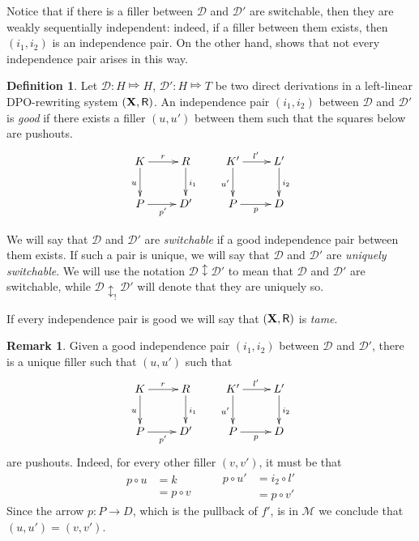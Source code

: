 \documentclass[a4paper]{article}
\def\R{\mathsf{R}}
\def\X{\textbf {\textup{X}}}
\renewcommand{\P}{\textbf {\textup{P}}}
\newcommand{\dder}[1]{\mathscr{#1}}
\theoremstyle{definition}
\newtheorem{definition}[theorem]{Definition}
\newtheorem{remark}[theorem]{Remark}
\begin{document}
Notice that if there is a filler between  $\dder{D}$ and $\dder{D}'$ are switchable, then they are weakly sequentially independent: indeed, if a filler between them exists, then $(i_1, i_2)$ is an independence pair. On the other hand,  shows that not every independence pair arises in this way.

\begin{definition}
  \label{de:good-switchable}
  Let $\dder{D}\colon H\Mapsto H$, $\dder{D}'\colon H\Mapsto T$ be two
  direct derivations in a left-linear DPO-rewriting system $(\X,
  \R)$. An independence pair $(i_1, i_2)$ between $\dder{D}$ and
  $\dder{D}'$ is \emph{good} if there exists a filler $(u,u')$ between
  them such that the squares below are
  pushouts.\[\xymatrix{K \ar[r]^{r} \ar[d]_{u}& R \ar[d]^{i_1} &K'
      \ar[r]^{l'} \ar[d]_{u'}& L'\ar[d]^{i_2} \\P \ar[r]_{p'}& D' & P
      \ar[r]_{p} & D}\]
	
We will say that $\dder{D}$ and $\dder{D}'$ are \emph{switchable} if a good independence pair between them exists. If such a pair is unique, we will say that $\dder{D}$ and $\dder{D}'$ are \emph{uniquely switchable}. We will use the notation $\dder{D}\updownarrow \dder{D'}$ to mean that $\dder{D}$ and $\dder{D}'$ are switchable, while $\dder{D}\updownarrow_! \dder{D'}$ will denote that they are uniquely so.


If every independence pair is good we will say that $(\X, \R)$ is \emph{tame}.
\end{definition}

\begin{remark}\label{rem:unic} Given a good independence pair $(i_1, i_2)$ between $\dder{D}$ and $\dder{D}'$, there is a unique filler  such that $(u,u')$ such that 
	\[\xymatrix{K \ar[r]^{r} \ar[d]_{u}& R \ar[d]^{i_1} &K' \ar[r]^{l'} \ar[d]_{u'}& L'\ar[d]^{i_2} \\P \ar[r]_{p'}& D' & P \ar[r]_{p} & D}\]
	are pushouts. Indeed, for every other filler $(v,v')$, it must be that
	\[\begin{split}
		p\circ u &=k \\&= p\circ v
	\end{split}\qquad \begin{split}
	p\circ u' &= i_2\circ l' \\&= p\circ v'
	\end{split}\]
	Since the arrow $p\colon P\to D$, which is the pullback of $f'$, is in $\mathcal{M}$ we conclude that $(u,u')=(v,v')$.
\end{remark}
\end{document}
